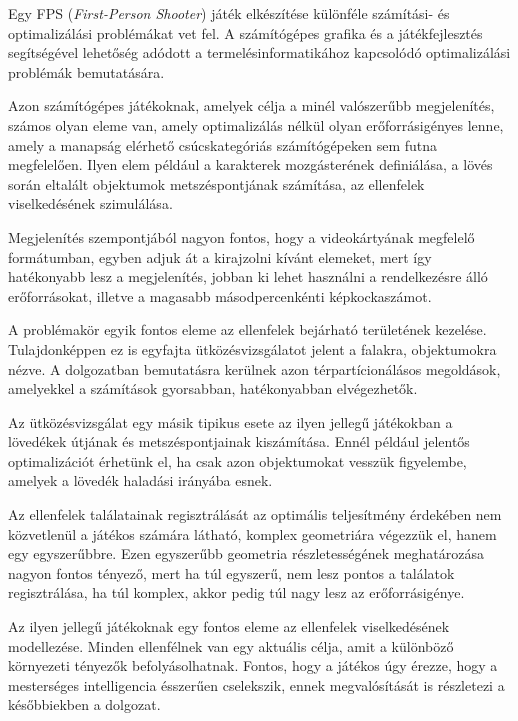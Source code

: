 \label{Chap:bevezetes}

Egy FPS (\textit{First-Person Shooter}) játék elkészítése különféle számítási- és optimalizálási problémákat vet fel. A számítógépes grafika és a játékfejlesztés segítségével lehetőség adódott a termelésinformatikához kapcsolódó optimalizálási problémák bemutatására.

Azon számítógépes játékoknak, amelyek célja a minél valószerűbb megjelenítés, számos olyan eleme van, amely optimalizálás nélkül olyan erőforrásigényes lenne, amely a manapság elérhető csúcskategóriás számítógépeken sem futna megfelelően. Ilyen elem például a karakterek mozgásterének definiálása, a lövés során eltalált objektumok metszéspontjának számítása, az ellenfelek viselkedésének szimulálása.

Megjelenítés szempontjából nagyon fontos, hogy a videokártyának megfelelő formátumban, egyben adjuk át a kirajzolni kívánt elemeket, mert így hatékonyabb lesz a megjelenítés, jobban ki lehet használni a rendelkezésre álló erőforrásokat, illetve a magasabb másodpercenkénti képkockaszámot.

A problémakör egyik fontos eleme az ellenfelek bejárható területének kezelése. Tulajdonképpen ez is egyfajta ütközésvizsgálatot jelent a falakra, objektumokra nézve. A dolgozatban bemutatásra kerülnek azon térpartícionálásos megoldások, amelyekkel a számítások gyorsabban, hatékonyabban elvégezhetők.

Az ütközésvizsgálat egy másik tipikus esete az ilyen jellegű játékokban a lövedékek útjának és metszéspontjainak kiszámítása. Ennél például jelentős optimalizációt érhetünk el, ha csak azon objektumokat vesszük figyelembe, amelyek a lövedék haladási irányába esnek.

Az ellenfelek találatainak regisztrálását az optimális teljesítmény érdekében nem közvetlenül a játékos számára látható, komplex geometriára végezzük el, hanem egy egyszerűbbre. Ezen egyszerűbb geometria részletességének meghatározása nagyon fontos tényező, mert ha túl egyszerű, nem lesz pontos a találatok regisztrálása, ha túl komplex, akkor pedig túl nagy lesz az erőforrásigénye.

Az ilyen jellegű játékoknak egy fontos eleme az ellenfelek viselkedésének modellezése. Minden ellenfélnek van egy aktuális célja, amit a különböző környezeti tényezők befolyásolhatnak. Fontos, hogy a játékos úgy érezze, hogy a mesterséges intelligencia ésszerűen cselekszik, ennek megvalósítását is részletezi a későbbiekben a dolgozat.
